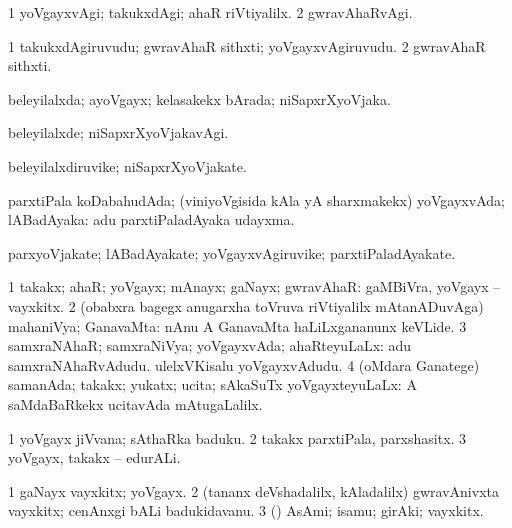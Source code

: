 \bentry
{} 
\gl{\kirxvi}
\expl{}
\bmng
\bnum
\num{1} yoVgayxvAgi; takukxdAgi; ahaR riVtiyalilx. 
\num{2} gwravAhaRvAgi. 
\enum
\emng
\eentry

\bentry
{} 
\gl{\nA}
\expl{}
\bmng
\bnum
\num{1} takukxdAgiruvudu; gwravAhaR sithxti; yoVgayxvAgiruvudu. 
\num{2} gwravAhaR sithxti. 
\enum
\emng
\eentry

\bentry
{} 
\gl{\gu}
\expl{}
\bmng
beleyilalxda; ayoVgayx; kelasakekx bArada; niSapxrXyoVjaka. 
\emng
\eentry

\bentry
{} 
\gl{\kirxvi}
\expl{}
\bmng
beleyilalxde; niSapxrXyoVjakavAgi. 
\emng
\eentry

\bentry
{} 
\gl{\nA}
\expl{}
\bmng
beleyilalxdiruvike; niSapxrXyoVjakate. 
\emng
\eentry

\bentry
{} 
\gl{\gu}
\expl{}
\bmng
parxtiPala koDabahudAda; (viniyoVgisida kAla yA sharxmakekx) yoVgayxvAda; lABadAyaka:  adu parxtiPaladAyaka udayxma. 
\emng
\eentry

\bentry
{} 
\gl{\nA}
\expl{}
\bmng
parxyoVjakate; lABadAyakate; yoVgayxvAgiruvike; parxtiPaladAyakate. 
\emng
\eentry

\bentry
{} 
\gl{\gu}
\bmng
\bnum
\num{1} takakx; ahaR; yoVgayx; mAnayx; gaNayx; gwravAhaR:  gaMBiVra, yoVgayx -- vayxkitx. 
\num{2} (obabxra bagegx anugarxha toVruva riVtiyalilx mAtanADuvAga) mahaniVya; GanavaMta:  nAnu A GanavaMta haLiLxgananunx keVLide. 
\num{3} samxraNAhaR; samxraNiVya; yoVgayxvAda; ahaRteyuLaLx:  adu samxraNAhaRvAdudu.  ulelxVKisalu yoVgayxvAdudu. 
\num{4} (oMdara Ganatege) samanAda; takakx; yukatx; ucita; sAkaSuTx yoVgayxteyuLaLx:  A saMdaBaRkekx ucitavAda mAtugaLalilx. 
\enum
\emng

\noindent
\gl{\pagu}
\expl{}
\bmng
\bnum
\num{1}  yoVgayx jiVvana; sAthaRka baduku. 
\num{2}  takakx parxtiPala, parxshasitx. 
\num{3}  yoVgayx, takakx -- edurALi. 
\enum
\emng
\eentry

\bentry
{} 
\gl{\nA}
\bmng
\bnum
\num{1} gaNayx vayxkitx; yoVgayx. 
\num{2} (tananx deVshadalilx, kAladalilx) gwravAnivxta vayxkitx; cenAnxgi bALi badukidavanu. 
\num{3} (\hA) AsAmi; isamu; girAki; vayxkitx. 
\enum
\emng
\eentry

